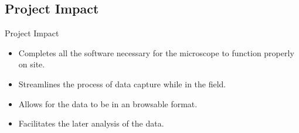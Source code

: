\documentclass[14pt, aspectratio=169]{beamer}
\begin{document}
\subsection{Project Impact}
\begin{frame}{Project Impact}
	\begin{itemize}
		\item Completes all the software necessary for the microscope to function properly on site.
		\item Streamlines the process of data capture while in the field.
		\item Allows for the data to be in an browsable format.
		\item Facilitates the later analysis of the data.
	\end{itemize}
\end{frame}
\end{document}
